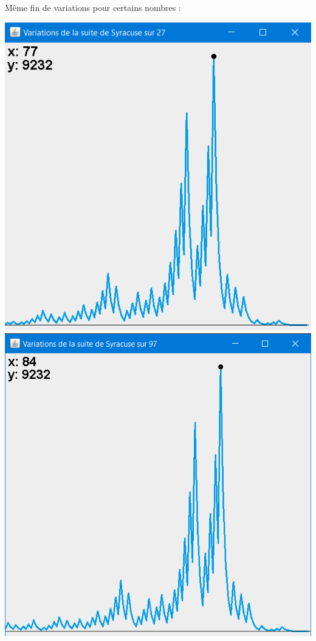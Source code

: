 \documentclass{beamer}
\begin{document}
\begin{frame}
Même fin de variations pour certains nombres :
\begin{center}
\includegraphics[scale=0.43]{images/syracuse_var_27.PNG}
\includegraphics[scale=0.41]{images/syracuse_var_97.PNG}
\end{center}
\end{frame}
\end{document}

